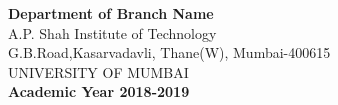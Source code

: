 \begin{titlepage}
{\hspace{.05cm}
\hspace{.05cm}

{\textbf {Department of Branch Name}}\\
A.P. Shah Institute of Technology\\
G.B.Road,Kasarvadavli, Thane(W), Mumbai-400615\\
UNIVERSITY OF MUMBAI\\
\vspace{0.3cm}
\textbf{Academic Year 2018-2019}\\
}
\end{titlepage}